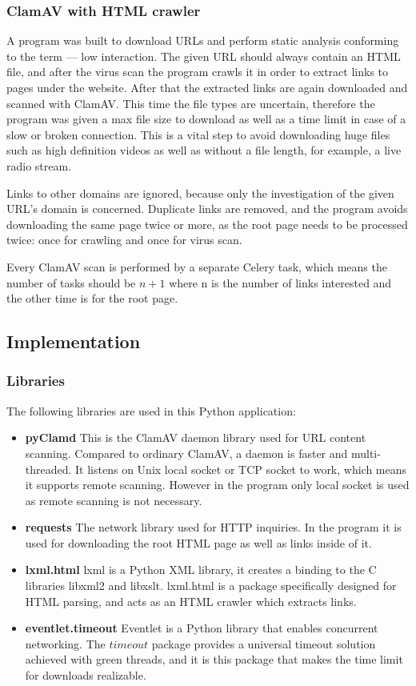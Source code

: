 \subsubsection{ClamAV with HTML crawler}
A program was built to download URLs and perform static analysis conforming to the term --- low interaction. The given URL should always contain 
an HTML file, and after the virus scan the program crawls it in order to extract links to pages 
under the website. After that the extracted links are again downloaded and 
scanned with ClamAV. This time the file types are uncertain, therefore the program was given a max file size to download as well as a time limit in case of a 
slow or broken connection. This is a vital step to avoid downloading huge files such as 
high definition videos as well as without a file length, for example, a live radio stream.

Links to other domains are ignored, because only the investigation 
of the given URL's domain is concerned. Duplicate links are removed, and the 
program avoids downloading the same page twice or more, as the root page needs 
to be processed twice: once for crawling and once for virus scan.

Every ClamAV scan is performed by a separate Celery task, which means the 
number of tasks should be $n+1$ where n is the number of links interested and 
the other time is for the root page.  

\subsection{Implementation}
\subsubsection{Libraries}
The following libraries are used in this Python application:
\begin{itemize}
\item {\bf pyClamd} This is the ClamAV daemon library used for URL content 
scanning. Compared to ordinary ClamAV, a daemon is faster and 
multi-threaded. It listens on Unix local socket or TCP socket to work, which 
means it supports remote scanning. However in the program only local socket is 
used as remote scanning is not necessary. 

\item {\bf requests} The network library used for HTTP inquiries. In the 
program it is used for downloading the root HTML page as well as links inside 
of it. 

\item {\bf lxml.html} lxml is a Python XML library, it creates a 
binding to the C libraries libxml2 and libxslt.\cite{lxml} lxml.html is a 
package specifically designed for HTML parsing, and acts as an HTML crawler 
which extracts links. 

\item {\bf eventlet.timeout} Eventlet is a Python library that enables 
concurrent networking. The $timeout$ package provides a universal timeout 
solution achieved with green threads, and it is this package that makes the time limit 
for downloads realizable. 
\end{itemize}

